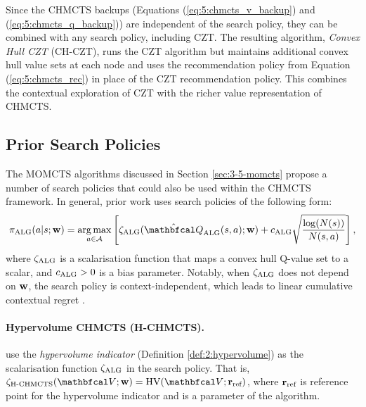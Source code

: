     Since the CHMCTS backups (Equations 
    (\ref{eq:5:chmcts_v_backup}) and 
    (\ref{eq:5:chmcts_q_backup})) are independent of the 
    search policy, they can be combined with any search 
    policy, including CZT. The resulting algorithm, 
    \textit{Convex Hull CZT} (CH-CZT), runs the CZT 
    algorithm but maintains additional convex hull value 
    sets at each node and uses the recommendation policy 
    from Equation (\ref{eq:5:chmcts_rec}) in place of the 
    CZT recommendation policy. This combines the contextual 
    exploration of CZT with the richer value representation 
    of CHMCTS.

\subsection{Prior Search Policies}
\label{sec:5-3-5-prior}

    The MOMCTS algorithms discussed in Section \ref{sec:3-5-momcts} propose a number of search policies that could also be used within the CHMCTS framework. In general, prior work uses search policies of the following form:
    \begin{align}
        \pialg(a|s;\bff{w}) = \argmax_{a\in\cl{A}} \left[
            \zetaalg(\Qalg(s,a);\bff{w}) + \calg 
            \sqrt{\frac{\log(N(s))}{N(s,a)}} \right],
            \label{eq:5:prior_policy}
    \end{align}
    where ${\zeta_{{\textnormal{ALG}}}}$ is a scalarisation function that maps a 
    convex hull Q-value set to a scalar, and ${c_{{\textnormal{ALG}}}} > 0$ is 
    a bias parameter. Notably, when ${\zeta_{{\textnormal{ALG}}}}$ does not depend 
    on $\mathbf{w}$, the search policy is context-independent, 
    which leads to linear cumulative contextual regret \cite{chmcts}.
 

\paragraph{Hypervolume CHMCTS (H-CHMCTS).}

    \citet{hv_momcts_1} use the \textit{hypervolume indicator} (Definition \ref{def:2:hypervolume}) as the scalarisation function ${\zeta_{{\textnormal{ALG}}}}$ in the search policy. That is, $\zetahchmcts(\bfcl{V};\bff{w}) = \HV(\bfcl{V};\rref)$, where $\mathbf{r}_{\textnormal{ref}}$ is reference point for the hypervolume indicator and is a parameter of the algorithm.
    
